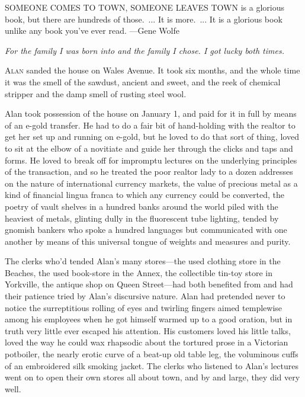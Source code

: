 \documentclass{article}
\begin{document}
\newpage

SOMEONE COMES TO TOWN, SOMEONE LEAVES TOWN is a glorious book, but
there are hundreds of those.~...  It is more.~...  It is a glorious
book unlike any book you've ever read.
{\flushright ---Gene Wolfe}

\vspace{1cm}

\noindent
\textit{For the family I was born into and the family I chose.  I got lucky
both times.}

\vspace{2in}

\lettrine[lines=3, lhang=.5, nindent=0pt, findent=2pt]{A}{lan} sanded the house on Wales Avenue.  It took six months, and the
whole time it was the smell of the sawdust, ancient and sweet, and the
reek of chemical stripper and the damp smell of rusting steel wool.

Alan took possession of the house on January 1, and paid for it in
full by means of an e-gold transfer.  He had to do a fair bit of
hand-holding with the realtor to get her set up and running on e-gold,
but he loved to do that sort of thing, loved to sit at the elbow of a
novitiate and guide her through the clicks and taps and forms.  He
loved to break off for impromptu lectures on the underlying principles
of the transaction, and so he treated the poor realtor lady to a dozen
addresses on the nature of international currency markets, the value
of precious metal as a kind of financial lingua franca to which any
currency could be converted, the poetry of vault shelves in a hundred
banks around the world piled with the heaviest of metals, glinting
dully in the fluorescent tube lighting, tended by gnomish bankers who
spoke a hundred languages but communicated with one another by means
of this universal tongue of weights and measures and purity.

The clerks who'd tended Alan's many stores---the used clothing store
in the Beaches, the used book-store in the Annex, the collectible
tin-toy store in Yorkville, the antique shop on Queen Street---had
both benefited from and had their patience tried by Alan's discursive
nature.  Alan had pretended never to notice the surreptitious rolling
of eyes and twirling fingers aimed templewise among his employees when
he got himself warmed up to a good oration, but in truth very little
ever escaped his attention.  His customers loved his little talks,
loved the way he could wax rhapsodic about the tortured prose in a
Victorian potboiler, the nearly erotic curve of a beat-up old table
leg, the voluminous cuffs of an embroidered silk smoking jacket.  The
clerks who listened to Alan's lectures went on to open their own
stores all about town, and by and large, they did very well.
\end{document}
